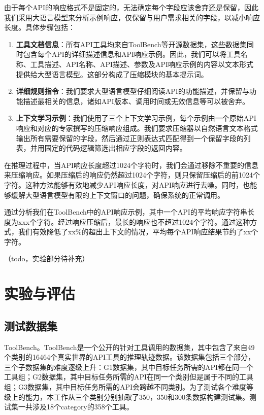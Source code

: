 由于每个API的响应格式不是固定的，无法确定每个字段应该舍弃还是保留，因此我们采用大语言模型来分析示例响应，仅保留与用户需求相关的字段，以减小响应长度。具体步骤包括：

\begin{enumerate}
    \item \textbf{工具文档信息}：所有API工具均来自ToolBench等开源数据集，这些数据集同时包含每个API的详细描述信息和API响应示例。因此，我们可以将工具名称、工具描述、API名称、API描述、参数及API响应示例的内容以文本形式提供给大型语言模型。这部分构成了压缩模块的基本提示词。
    
    \item \textbf{详细规则指令}：我们要求大型语言模型仔细阅读API的功能描述，并保留与功能描述最相关的信息，诸如API版本、调用时间或无效信息等可以被舍弃。
    
    \item \textbf{上下文学习示例}：我们使用了三个上下文学习示例，每个示例由一个原始API响应和对应的专家撰写的压缩响应组成。我们要求压缩器以自然语言文本格式输出所有需要保留的字段，然后通过正则表达式匹配得到一个保留字段的列表，并用固定的代码逻辑筛选出相应字段的返回内容。
\end{enumerate}

在推理过程中，当API响应长度超过1024个字符时，我们会通过移除不重要的信息来压缩响应。如果压缩后的响应仍然超过1024个字符，则只保留压缩后的前1024个字符。这种方法能够有效地减少API响应长度，对API响应进行去噪。同时，也能够缓解大型语言模型有限的上下文窗口的问题，确保系统的正常调用。

通过分析我们在ToolBench中的API响应示例，其中一个API的平均响应字符串长度为xxx个字符。经过响应压缩后，最长的响应也不超过1024个字符。通过这种方式，我们有效降低了xx\%的超出上下文的情况，平均每个API响应结果节约了xx个字符。

（todo，实验部分待补充）

\section{实验与评估}

\subsection{测试数据集}
\label{subsec:test_dataset}

ToolBench。ToolBench\cite{Qin2023}是一个公开的针对工具调用的数据集，其中包含了来自49个类别的16464个真实世界的API工具的推理轨迹数据。该数据集包括三个部分，三个子数据集的难度逐级上升：G1数据集，其中目标任务所需的API都在同一个工具组；G2数据集，其中目标任务所需的API在同一个类别但是属于不同的工具组；G3数据集，其中目标任务所需的API会跨越不同类别。为了测试各个难度等级上的能力，本工作从三个类别分别抽取了350，350和300条数据构建测试集。测试集一共涉及18个category的358个工具。


